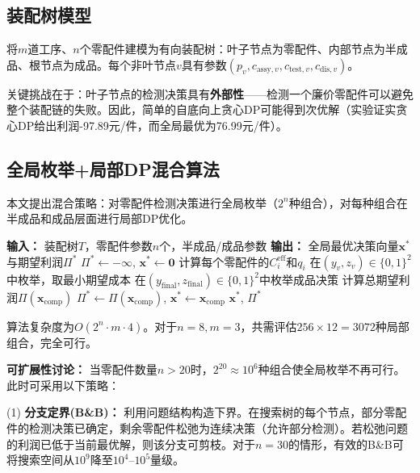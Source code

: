 \documentclass[12pt,a4paper]{ctexart}
\begin{document}
\subsection{装配树模型}

将$m$道工序、$n$个零配件建模为有向装配树：叶子节点为零配件、内部节点为半成品、根节点为成品。每个非叶节点$v$具有参数$(p_v, c_{\text{assy},v}, c_{\text{test},v}, c_{\text{dis},v})$。

关键挑战在于：叶子节点的检测决策具有\textbf{外部性}——检测一个廉价零配件可以避免整个装配链的失败。因此，简单的自底向上贪心DP可能得到次优解（实验证实贪心DP给出利润-97.89元/件，而全局最优为76.99元/件）。

\subsection{全局枚举+局部DP混合算法}

本文提出混合策略：对零配件检测决策进行全局枚举（$2^n$种组合），对每种组合在半成品和成品层面进行局部DP优化。

\begin{algorithm}[H]
\caption{装配树全局优化算法}
\begin{algorithmic}[1]
\State \textbf{输入：} 装配树$T$，零配件参数$n$个，半成品/成品参数
\State \textbf{输出：} 全局最优决策向量$\mathbf{x}^*$与期望利润$\Pi^*$
\State $\Pi^* \leftarrow -\infty$, $\mathbf{x}^* \leftarrow \mathbf{0}$
    \State 计算每个零配件的$C_i^{\text{eff}}$和$q_i$
        \State 在$(y_v, z_v) \in \{0,1\}^2$中枚举，取最小期望成本
    \EndFor
    \State 在$(y_{\text{final}}, z_{\text{final}}) \in \{0,1\}^2$中枚举成品决策
    \State 计算总期望利润$\Pi(\mathbf{x}_{\text{comp}})$
        \State $\Pi^* \leftarrow \Pi(\mathbf{x}_{\text{comp}})$, $\mathbf{x}^* \leftarrow \mathbf{x}_{\text{comp}}$
    \EndIf
\EndFor
\State \Return $\mathbf{x}^*$, $\Pi^*$
\end{algorithmic}
\end{algorithm}

算法复杂度为$O(2^n \cdot m \cdot 4)$。对于$n=8, m=3$，共需评估$256 \times 12 = 3072$种局部组合，完全可行。

\textbf{可扩展性讨论：} 当零配件数量$n>20$时，$2^{20} \approx 10^6$种组合使全局枚举不再可行。此时可采用以下策略：

(1) \textbf{分支定界(B\&B)：} 利用问题结构构造下界。在搜索树的每个节点，部分零配件的检测决策已确定，剩余零配件松弛为连续决策（允许部分检测）。若松弛问题的利润已低于当前最优解，则该分支可剪枝。对于$n=30$的情形，有效的B\&B可将搜索空间从$10^9$降至$10^4$--$10^5$量级。
\end{document}
